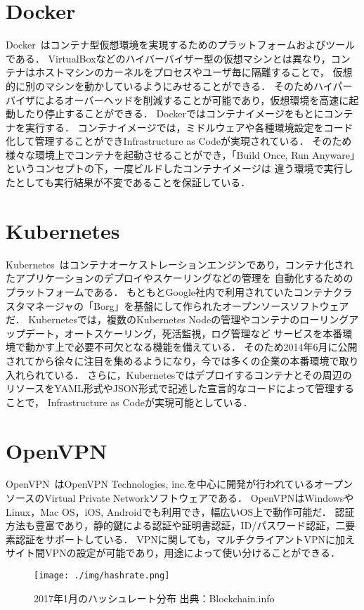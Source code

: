 \section{Docker}
\label{background:docker}

Docker~\cite{Docker}はコンテナ型仮想環境を実現するためのプラットフォームおよびツールである．
VirtualBoxなどのハイバーバイザー型の仮想マシンとは異なり，コンテナはホストマシンのカーネルをプロセスやユーザ毎に隔離することで，
仮想的に別のマシンを動かしているようにみせることができる．
そのためハイパーバイザによるオーバーヘッドを削減することが可能であり，仮想環境を高速に起動したり停止することができる．
Dockerではコンテナイメージをもとにコンテナを実行する．
コンテナイメージでは，ミドルウェアや各種環境設定をコード化して管理することができInfrastructure as Codeが実現されている．
そのため様々な環境上でコンテナを起動させることができ，「Build Once, Run Anyware」というコンセプトの下，一度ビルドしたコンテナイメージは
違う環境で実行したとしても実行結果が不変であることを保証している．

\section{Kubernetes}
\label{background:kubernetes}

Kubernetes~\cite{Kubernetes}はコンテナオーケストレーションエンジンであり，コンテナ化されたアプリケーションのデプロイやスケーリングなどの管理を
自動化するためのプラットフォームである．
もともとGoogle社内で利用されていたコンテナクラスタマネージャの「Borg」を基盤にして作られたオープンソースソフトウェアだ．
Kubernetesでは，複数のKubernetes Nodeの管理やコンテナのローリングアップデート，オートスケーリング，死活監視，ログ管理など
サービスを本番環境で動かす上で必要不可欠となる機能を備えている．
そのため2014年6月に公開されてから徐々に注目を集めるようになり，今では多くの企業の本番環境で取り入れられている．
さらに，Kubernetesではデプロイするコンテナとその周辺のリソースをYAML形式やJSON形式で記述した宣言的なコードによって管理することで，
Infrastructure as Codeが実現可能としている．

\section{OpenVPN}
\label{background:openvpn}

OpenVPN~\cite{OpenVPN}はOpenVPN Technologies, inc.を中心に開発が行われているオープンソースのVirtual Private Networkソフトウェアである．
OpenVPNはWindowsやLinux，Mac OS，iOS, Androidでも利用でき，幅広いOS上で動作可能だ．
認証方法も豊富であり，静的鍵による認証や証明書認証，ID/パスワード認証，二要素認証をサポートしている．
VPNに関しても，マルチクライアントVPNに加えサイト間VPNの設定が可能であり，用途によって使い分けることができる．

\begin{figure}[h]
    \begin{center}
        \texttt{[image: ./img/hashrate.png]}
        \caption{2017年1月のハッシュレート分布 出典：Blockchain.info\cite{bitcoinhashrate}}
        \label{img:hashrate}
    \end{center}
\end{figure}
\fi
